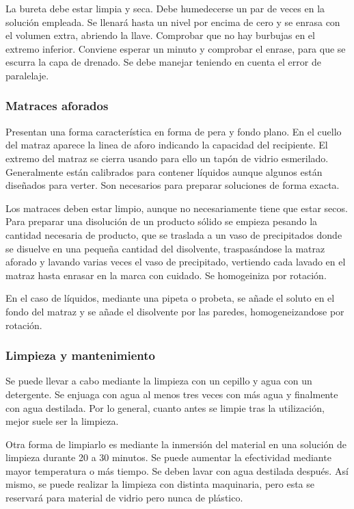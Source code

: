 La bureta debe estar limpia y seca. Debe humedecerse un par de veces en la solución empleada. Se llenará hasta un nivel por encima de cero y se enrasa con el volumen extra, abriendo la llave. Comprobar que no hay burbujas en el extremo inferior. Conviene esperar un minuto y comprobar el enrase, para que se escurra la capa de drenado. Se debe manejar teniendo en cuenta el error de paralelaje.
\subsubsection{Matraces aforados}
Presentan una forma característica en forma de pera y fondo plano. En el cuello del matraz aparece la linea de aforo indicando la capacidad del recipiente. El extremo del matraz se cierra usando para ello un tapón de vidrio esmerilado. Generalmente están calibrados para contener líquidos aunque algunos están diseñados para verter. Son necesarios para preparar soluciones de forma exacta.

Los matraces deben estar limpio, aunque no necesariamente tiene que estar secos. Para preparar una disolución de un producto sólido se empieza pesando la cantidad necesaria de producto, que se traslada a un vaso de precipitados donde se disuelve en una pequeña cantidad del disolvente, traspasándose la matraz aforado y lavando varias veces el vaso de precipitado, vertiendo cada lavado en el matraz hasta enrasar en la marca con cuidado. Se homogeiniza por rotación.

En el caso de líquidos, mediante una pipeta o probeta, se añade el soluto en el fondo del matraz y se añade el disolvente por las paredes, homogeneizandose por rotación.
\subsubsection{Limpieza y mantenimiento}
Se puede llevar a cabo mediante la limpieza con un cepillo y agua con un detergente. Se enjuaga con agua al menos tres veces con más agua y finalmente con agua destilada. Por lo general, cuanto antes se limpie tras la utilización, mejor suele ser la limpieza.

Otra forma de limpiarlo es mediante la inmersión del material en una solución de limpieza durante 20 a 30 minutos. Se puede aumentar la efectividad mediante mayor temperatura o más tiempo. Se deben lavar con agua destilada después. Así mismo, se puede realizar la limpieza con distinta maquinaria, pero esta se reservará para material de vidrio pero nunca de plástico.
